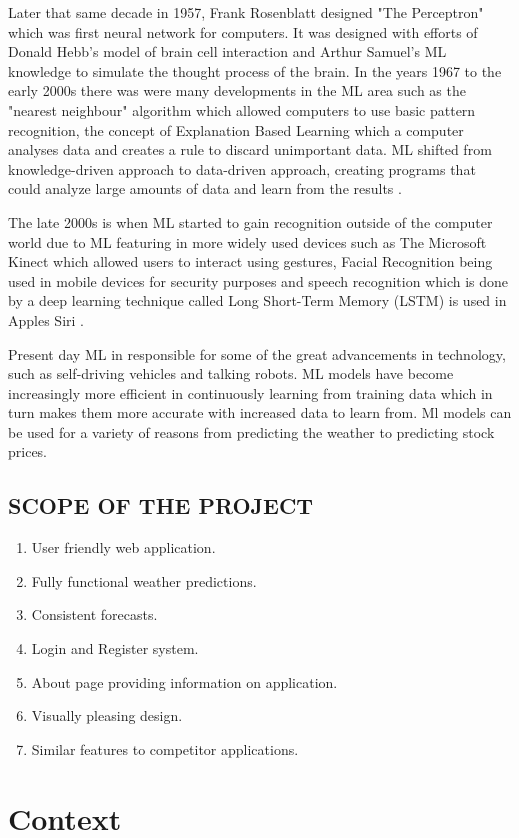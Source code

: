 Later that same decade in 1957, Frank Rosenblatt designed "The Perceptron" which was first neural network for computers. It was designed with efforts of Donald Hebb's model of brain cell interaction and Arthur Samuel's ML knowledge to simulate the thought process of the brain. In the years 1967 to the early 2000s there was were many developments in the ML area such as the "nearest neighbour" algorithm which allowed computers to use basic pattern recognition, the concept of Explanation Based Learning which a computer analyses data and creates a rule to discard unimportant data. ML shifted from knowledge-driven approach to data-driven approach, creating programs that could analyze large amounts of data and learn from the results \cite{MLAlgorithmsHistory}.

The late 2000s is when ML started to gain recognition outside of the computer world due to ML featuring in more widely used devices such as The Microsoft Kinect which allowed users to interact using gestures, Facial Recognition being used in mobile devices for security purposes and speech recognition which is done by a deep learning technique called Long Short-Term Memory (LSTM) is used in Apples Siri \cite{MLAlgorithmsHistory}.

Present day ML in responsible for some of the great advancements in technology, such as self-driving vehicles and talking robots. ML models have become increasingly more efficient in continuously learning from training data which in turn makes them more accurate with increased data to learn from. Ml models can be used for a variety of reasons from predicting the weather to predicting stock prices.
\newpage
\section{SCOPE OF THE PROJECT}
\begin{enumerate}
\item User friendly web application.
\item Fully functional weather predictions.
\item Consistent forecasts.
\item Login and Register system.
\item About page providing information on application.
\item Visually pleasing design.
\item Similar features to competitor applications.
\end{enumerate}

\chapter{Context}
